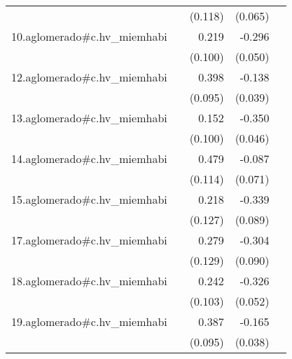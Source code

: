 {\begin{longtable}{l*{4}{D{.}{.}{-1}}}
            &                     &     (0.118)         &     (0.065)         &                     \\
\addlinespace
10.aglomerado#c.hv\_miemhabi&                     &       0.219\sym{*}  &      -0.296\sym{***}&                     \\
            &                     &     (0.100)         &     (0.050)         &                     \\
\addlinespace
12.aglomerado#c.hv\_miemhabi&                     &       0.398\sym{***}&      -0.138\sym{***}&                     \\
            &                     &     (0.095)         &     (0.039)         &                     \\
\addlinespace
13.aglomerado#c.hv\_miemhabi&                     &       0.152         &      -0.350\sym{***}&                     \\
            &                     &     (0.100)         &     (0.046)         &                     \\
\addlinespace
14.aglomerado#c.hv\_miemhabi&                     &       0.479\sym{***}&      -0.087         &                     \\
            &                     &     (0.114)         &     (0.071)         &                     \\
\addlinespace
15.aglomerado#c.hv\_miemhabi&                     &       0.218         &      -0.339\sym{***}&                     \\
            &                     &     (0.127)         &     (0.089)         &                     \\
\addlinespace
17.aglomerado#c.hv\_miemhabi&                     &       0.279\sym{*}  &      -0.304\sym{***}&                     \\
            &                     &     (0.129)         &     (0.090)         &                     \\
\addlinespace
18.aglomerado#c.hv\_miemhabi&                     &       0.242\sym{*}  &      -0.326\sym{***}&                     \\
            &                     &     (0.103)         &     (0.052)         &                     \\
\addlinespace
19.aglomerado#c.hv\_miemhabi&                     &       0.387\sym{***}&      -0.165\sym{***}&                     \\
            &                     &     (0.095)         &     (0.038)         &                     \\

\end{longtable}}

